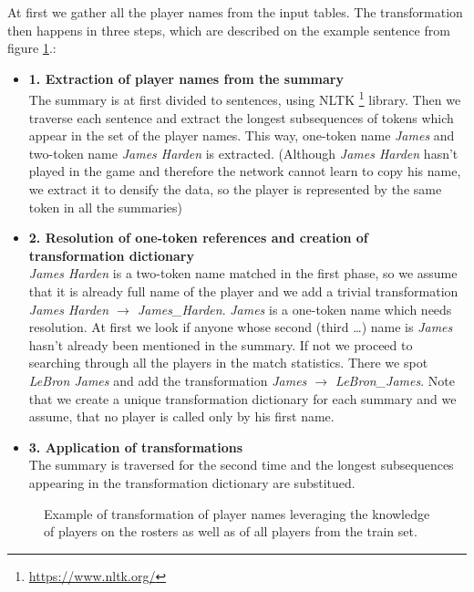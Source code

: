 At first we gather all the player names from the input tables. The transformation then happens in three steps, which are described on the example sentence from figure \ref{cmp_original_vs_mine}.:
\begin{itemize}
    \item \textbf{1. Extraction of player names from the summary} \hfill \\
    The summary is at first divided to sentences, using NLTK \footnote{\url{https://www.nltk.org/}} library. Then we traverse each sentence and extract the longest subsequences of tokens which appear in the set of the player names. This way, one-token name \emph{James} and two-token name \emph{James Harden} is extracted. (Although \emph{James Harden} hasn't played in the game and therefore the network cannot learn to copy his name, we extract it to densify the data, so the player is represented by the same token in all the summaries)
    \item \textbf{2. Resolution of one-token references and creation of transformation dictionary} \hfill \\
    \emph{James Harden} is a two-token name matched in the first phase, so we assume that it is already full name of the player and we add a trivial transformation \emph{James Harden $\rightarrow$ James\_Harden}. \emph{James} is a one-token name which needs resolution. At first we look if anyone whose second (third \dots) name is \emph{James} hasn't already been mentioned in the summary. If not we proceed to searching through all the players in the match statistics. There we spot \emph{LeBron James} and add the transformation \emph{James $\rightarrow$ LeBron\_James}. Note that we create a unique transformation dictionary for each summary and we assume, that no player is called only by his first name.
    \item \textbf{3. Application of transformations} \hfill \\
    The summary is traversed for the second time and the longest subsequences appearing in the transformation dictionary are substitued.
\end{itemize}

\begin{figure}[!h]
    \centering
    \usetikzlibrary{shapes.multipart}
    \caption{Example of transformation of player names leveraging the knowledge of players on the rosters as well as of all players from the train set.} \label{cmp_original_vs_mine}
\end{figure}

